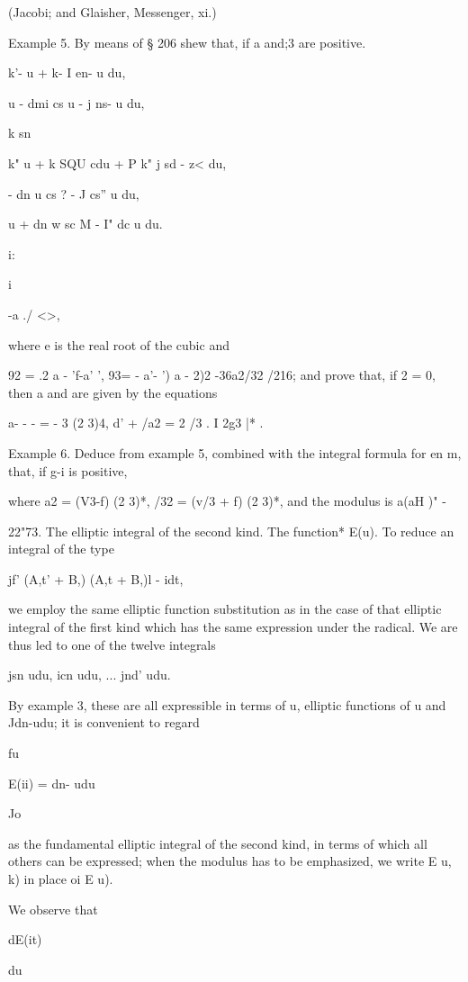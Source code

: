 (Jacobi; and Glaisher, Messenger, xi.)

Example 5. By means of § 206 shew that, if a and;3 are positive.

k'- u + k- I en- u du,

u - dmi cs u - j ns- u du,

k sn %

k" u + k SQU cdu + P k" j sd - z< du,

- dn u cs ? - J cs'' u du,

u + dn w sc M - I" dc u du.

i:

 i

-a ./ <>,

where e is the real root of the cubic and

92 = .2 a - 'f-a' ', 93= - a'- ') a - 2)2 -36a2/32 /216; and prove
that, if 2 = 0, then a and are given by the equations

a- - - = - 3 (2 3)4, d' + /a2 = 2 /3 . I 2g3 |* .

%
%

Example 6. Deduce from example 5, combined with the integral formula
for en m, that, if g-i is positive,

where a2 = (V3-f) (2 3)*, /32 = (v/3 + f) (2 3)*, and the modulus is
a(aH )" -

22"73. The elliptic integral of the second kind. The function* E(u).
To reduce an integral of the type

jf' (A,t' + B,) (A,t + B,)l - idt,

we employ the same elliptic function substitution as in the case of
that elliptic integral of the first kind which has the same expression
under the radical. We are thus led to one of the twelve integrals

jsn udu, icn udu, ... jnd' udu.

By example 3, these are all expressible in terms of u,
elliptic functions of u and Jdn-udu; it is convenient to regard

fu

E(ii) = dn- udu

Jo

as the fundamental elliptic integral of the second kind, in terms of
which all others can be expressed; when the modulus has to be
emphasized, we write E u, k) in place oi E u).

We observe that

dE(it)

du

